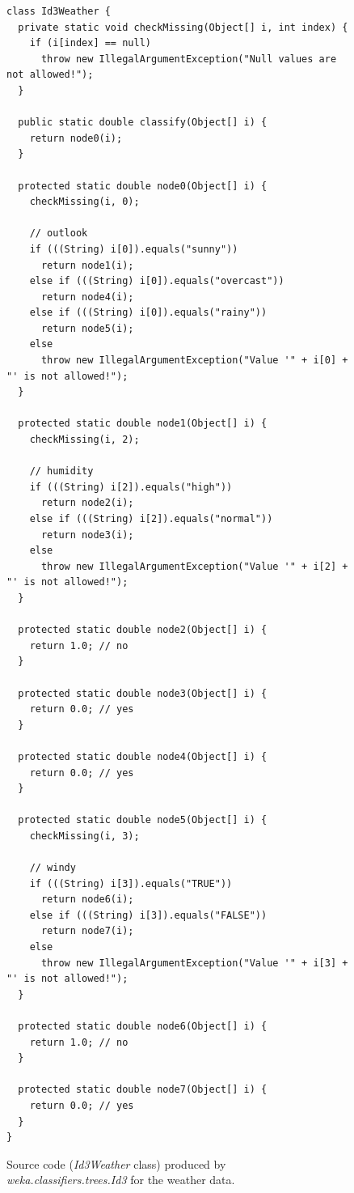 \begin{figure}[!thp]
\begin{mdframed}[innermargin=-1cm]
\begin{Verbatim}[fontsize=\scriptsize]
class Id3Weather {
  private static void checkMissing(Object[] i, int index) {
    if (i[index] == null)
      throw new IllegalArgumentException("Null values are not allowed!");
  }

  public static double classify(Object[] i) {
    return node0(i);
  }

  protected static double node0(Object[] i) {
    checkMissing(i, 0);

    // outlook
    if (((String) i[0]).equals("sunny"))
      return node1(i);
    else if (((String) i[0]).equals("overcast"))
      return node4(i);
    else if (((String) i[0]).equals("rainy"))
      return node5(i);
    else
      throw new IllegalArgumentException("Value '" + i[0] + "' is not allowed!");
  }

  protected static double node1(Object[] i) {
    checkMissing(i, 2);

    // humidity
    if (((String) i[2]).equals("high"))
      return node2(i);
    else if (((String) i[2]).equals("normal"))
      return node3(i);
    else
      throw new IllegalArgumentException("Value '" + i[2] + "' is not allowed!");
  }

  protected static double node2(Object[] i) {
    return 1.0; // no
  }

  protected static double node3(Object[] i) {
    return 0.0; // yes
  }

  protected static double node4(Object[] i) {
    return 0.0; // yes
  }

  protected static double node5(Object[] i) {
    checkMissing(i, 3);

    // windy
    if (((String) i[3]).equals("TRUE"))
      return node6(i);
    else if (((String) i[3]).equals("FALSE"))
      return node7(i);
    else
      throw new IllegalArgumentException("Value '" + i[3] + "' is not allowed!");
  }

  protected static double node6(Object[] i) {
    return 1.0; // no
  }

  protected static double node7(Object[] i) {
    return 0.0; // yes
  }
}
\end{Verbatim}
\end{mdframed}
\caption{\label{fig:weka_wrapper_1}Source code (\textit{Id3Weather} class) produced by \textit{weka.classifiers.trees.Id3} for the weather data.}
\end{figure}

